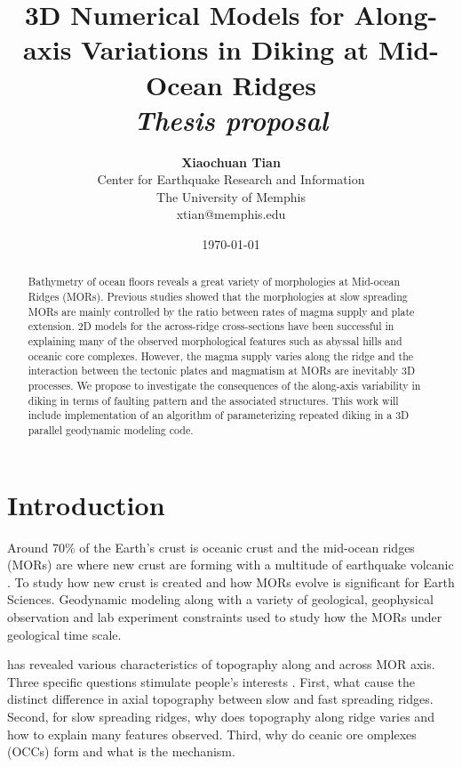 \documentclass[12pt]{article}
\title{{\bf 3D Numerical Models for Along-axis Variations in Diking at Mid-Ocean Ridges} \\
\it Thesis proposal}
\author{ {\bf Xiaochuan Tian}  \\
Center for Earthquake Research and Information \\
The University of Memphis\\
{\small xtian@memphis.edu}
}
\date{\today}
\begin{document}
\pagestyle{plain}
\maketitle

\pagebreak
\begin{abstract}

Bathymetry of ocean floors reveals a great variety of morphologies at Mid-ocean Ridges (MORs). Previous studies showed that the morphologies at slow spreading MORs are mainly controlled by the ratio between rates of magma supply and plate extension. 2D models for the across-ridge cross-sections have been successful in explaining many of the observed morphological features such as abyssal hills and oceanic core complexes. However, the magma supply varies along the ridge and the interaction between the tectonic plates and magmatism at MORs are inevitably 3D processes. We propose to investigate the consequences of the along-axis variability in diking in terms of faulting pattern and the associated structures. This work will include implementation of an algorithm of parameterizing repeated diking in a 3D parallel geodynamic modeling code.

\end{abstract}

\pagebreak
\tableofcontents
\pagebreak

\cleardoublepage
{}

\section{Introduction}
\label{ch:intro}

Around 70\% of the Earth's crust is oceanic crust and the mid-ocean ridges (MORs) are where new crust are forming with a multitude of earthquake volcanic . To study how new crust is created and how MORs evolve is significant for Earth Sciences.  Geodynamic modeling along with a variety of geological, geophysical observation and lab experiment constraints  used to study how the MORs  under geological time scale.

 has revealed various characteristics of topography along and across MOR axis. Three specific questions stimulate people's interests . First, what cause the distinct difference in axial topography between slow and fast spreading ridges. Second, for slow spreading ridges, why does topography  along ridge varies and how to explain many features observed. Third, why do ceanic ore omplexes (OCCs) form and what is the mechanism. 
\end{document}
